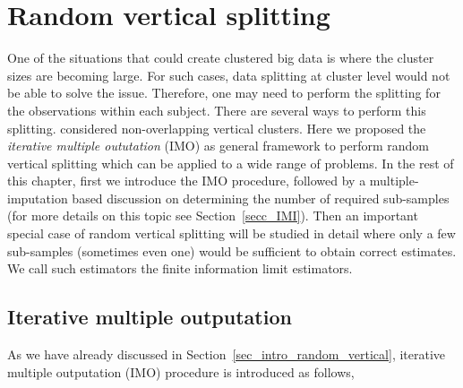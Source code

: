 \documentclass[11pt,a5paper,twoside]{book}
\begin{document}
\chapter{Random vertical splitting}
\label{chap_random_vertical}
One of the situations that could create clustered big data is where the cluster sizes are becoming large. For such cases, data splitting at cluster level would not be able to solve the issue. Therefore, one may need to perform the splitting for the observations within each subject. There are several ways to perform this splitting. \cite{Iddi2011} considered non-overlapping vertical clusters. Here we proposed the \emph{iterative multiple oututation} (IMO) as general framework to perform random vertical splitting which can be applied to a wide range of problems. In the rest of this chapter, first we introduce the IMO procedure, followed by a multiple-imputation based discussion on determining the number of required sub-samples (for more details on this topic see Section~\ref{secc_IMI}). Then an important special case of random vertical splitting will be studied in detail where only a few sub-samples (sometimes even one) would be sufficient to obtain correct estimates. We call such estimators the finite information limit estimators.


\section{Iterative multiple outputation}

As we have already discussed in Section~\ref{sec_intro_random_vertical}, iterative multiple outputation (IMO) procedure is introduced as follows,
\end{document}
